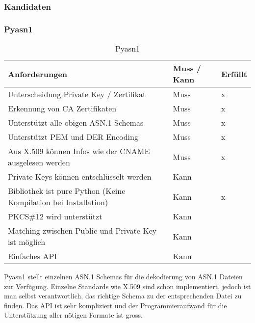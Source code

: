 \subsubsection{Kandidaten}
\subsubsection{Pyasn1}
\begin{table}[H]
\centering
    \begin{tabular}{|p{12cm}|l|l|}
    \hline
    \rowcolor{lightblue}
    Anforderungen & Muss / Kann & Erfüllt   \\ \hline
	Unterscheidung Private Key / Zertifikat	&	Muss & x \\ \hline	
	Erkennung von CA Zertifikaten	&	Muss	& x \\ \hline	
	Unterstützt alle obigen ASN.1 Schemas	&	Muss	& x \\ \hline		
	Unterstützt PEM und DER Encoding	&	Muss	& x \\ \hline	
	Aus X.509 können Infos wie der CNAME ausgelesen werden &	Muss	& x \\ \hline	
	Private Keys können entschlüsselt werden &	Kann &  \\ \hline
	Bibliothek ist pure Python (Keine Kompilation bei Installation) &	Kann	&  x \\ \hline
	PKCS\#12 wird unterstützt &	Kann &  \\ \hline
	Matching zwischen Public und Private Key ist möglich &	Kann &  \\ \hline
	Einfaches API &	Kann &  \\ \hline
	\end{tabular}
    \caption[Pyasn1]{Pyasn1}
\end{table}
\medskip
Pyasn1 stellt einzelnen ASN.1 Schemas für die dekodierung von ASN.1 Dateien zur Verfügung. Einzelne Standards wie X.509 sind schon implementiert, jedoch ist man selbst verantwortlich, das richtige Schema zu der entsprechenden Datei zu finden. Das API ist sehr kompliziert und der Programmieraufwand für die Unterstützung aller nötigen Formate ist gross.\\


